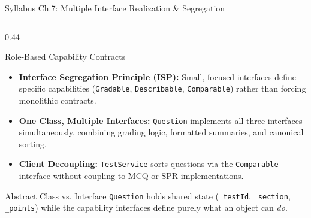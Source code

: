 ﻿\documentclass[aspectratio=169,10pt,t]{beamer}
\begin{document}
\begin{frame}[fragile]{Syllabus Ch.7: Multiple Interface Realization \& Segregation}
\begin{columns}[T,onlytextwidth]
    \begin{column}{0.44\textwidth}
      \begin{infoCard}{Role-Based Capability Contracts}
        \begin{itemize}\setlength{\itemsep}{1.2pt}\setlength{\parskip}{0pt}\setlength{\leftmargini}{7pt}
          \item \textbf{Interface Segregation Principle (ISP):} Small, focused interfaces define specific capabilities (\texttt{Gradable}, \texttt{Describable}, \texttt{Comparable}) rather than forcing monolithic contracts.
          \item \textbf{One Class, Multiple Interfaces:} \texttt{Question} implements all three interfaces simultaneously, combining grading logic, formatted summaries, and canonical sorting.
          \item \textbf{Client Decoupling:} \texttt{TestService} sorts questions via the \texttt{Comparable} interface without coupling to MCQ or SPR implementations.
        \end{itemize}
      \end{infoCard}
      \vspace{1mm}
      \begin{hlCard}{Abstract Class vs. Interface}
        \fontsize{5.4pt}{6.4pt}\selectfont
        \texttt{Question} holds shared state (\texttt{\_testId}, \texttt{\_section}, \texttt{\_points}) while the capability interfaces define purely what an object can \emph{do}.
      \end{hlCard}
    \end{column}
  \end{columns}
\end{frame}
\end{document}
